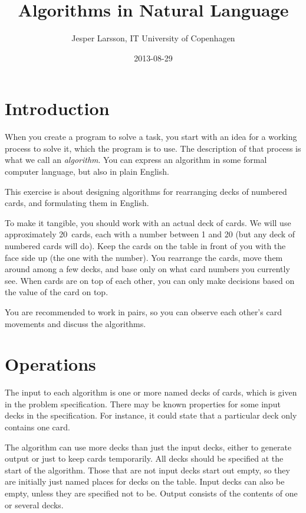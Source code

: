 \documentclass[a4paper,twoside]{tufte-handout}
\title{Algorithms in Natural Language}
\author{Jesper Larsson, IT University of Copenhagen}
\date{2013-08-29}
\begin{document}
\maketitle

\section{Introduction}\label{sec-intro}

When you create a program to solve a task, you start with an idea for
a working process to solve it, which the program is to use. The
description of that process is what we call an \emph{algorithm}. You
can express an algorithm in some formal computer language, but also in
plain English.

This exercise is about designing algorithms for rearranging decks of
numbered cards, and formulating them in English.

To make it tangible, you should work with an actual deck of cards. We
will use approximately 20~cards, each with a number between 1 and 20
(but any deck of numbered cards will do). Keep the cards on the table
in front of you with the face side up (the one with the number). You
rearrange the cards, move them around among a few decks, and base
only on what card numbers you currently see. When
cards are on top of each other, you can only make decisions based on
the value of the card on top.

You are recommended to work in pairs, so you can observe each
other's card movements and discuss the algorithms.

\section{Operations}\label{sec-ops}

The input to each algorithm is one or more named decks of cards, which
is given in the problem specification. There may be known properties
for some input decks in the specification. For instance, it could
state that a particular deck only contains one card.

The algorithm can use more decks than just the input decks, either to
generate output or just to keep cards temporarily. All decks should be
specified at the start of the algorithm. Those that are not input
decks start out empty, so they are initially just named places for
decks on the table. Input decks can also be empty, unless they are specified
not to be. Output consists of the contents of one or several decks.
\end{document}
